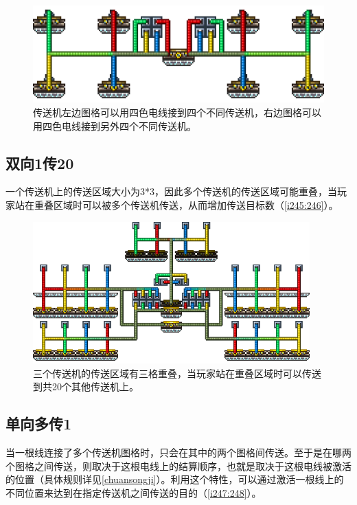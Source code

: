 \begin{figure}[!ht]
\centering
\includegraphics{images/244.png}
\caption{传送机左边图格可以用四色电线接到四个不同传送机，右边图格可以用四色电线接到另外四个不同传送机。}
\label{i243:244}
\end{figure}

\subsection{双向1传20}\label{sec12}
一个传送机上的传送区域大小为3*3，因此多个传送机的传送区域可能重叠，当玩家站在重叠区域时可以被多个传送机传送，从而增加传送目标数（\autoref{i245:246}）。

\begin{figure}[!ht]
\centering
\includegraphics[width=0.95\textwidth]{images/246.png}
\caption{三个传送机的传送区域有三格重叠，当玩家站在重叠区域时可以传送到共20个其他传送机上。}
\label{i245:246}
\end{figure}

\subsection{单向多传1}\label{sec13}
当一根线连接了多个传送机图格时，只会在其中的两个图格间传送。至于是在哪两个图格之间传送，则取决于这根电线上的结算顺序，也就是取决于这根电线被激活的位置（具体规则详见\autoref{chuansongji}）。利用这个特性，可以通过激活一根线上的不同位置来达到在指定传送机之间传送的目的（\autoref{i247:248}）。

